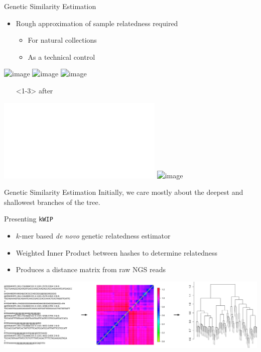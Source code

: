 \documentclass[t]{beamer}
\begin{document}
\begin{frame}{Genetic Similarity Estimation}
  \begin{itemize}
    \item Rough approximation of sample relatedness required
      \begin{itemize}
        \item For natural collections
        \item As a technical control
      \end{itemize}
  \end{itemize}
  \begin{center}
    \includegraphics<1>[width=\textwidth]{img/restruct-1}
    \includegraphics<2>[width=\textwidth]{img/restruct-2}
    \includegraphics<3>[width=\textwidth]{img/restruct-3}
    \begin{itemize}
      \item[]<1-3> \tiny{after \textcite{brachi_genome-wide_2011}}
    \end{itemize}
    \includegraphics<4>[width=\textwidth]{img/jared-tree.pdf}
    \includegraphics<5>[width=0.6\textwidth]{img/at80-tree.png}
  \end{center}
\end{frame}


\begin{frame}[c]{Genetic Similarity Estimation}
  \centering Initially, we care mostly about the deepest and shallowest
  branches of the tree.
\end{frame}

\begin{frame}{Presenting \texttt{kWIP}}
  \begin{itemize}
    \item $k$-mer based \textit{de novo} genetic relatedness estimator
    \item Weighted Inner Product between hashes to determine relatedness
    \item Produces a distance matrix from raw NGS reads
  \end{itemize}
  \begin{center}
    \includegraphics[width=\textwidth]{img/kwip-overview.png}
  \end{center}
\end{frame}
\end{document}

